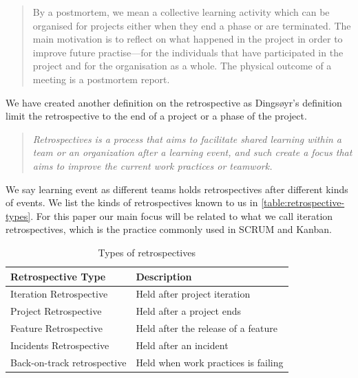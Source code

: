 \begin{quote}
By a postmortem, we mean a collective learning activity which
can be organised for projects either when they end a phase or
are terminated. The main motivation is to reflect on what happened
in the project in order to improve future practise—for the
individuals that have participated in the project and for the organisation
as a whole. The physical outcome of a meeting is a
postmortem report.
\end{quote}

We have created another definition on the retrospective as Dingsøyr's definition limit the retrospective to the end of a project or a phase of the project. 

\begin{quote}
	\textit{Retrospectives is a process that aims to facilitate shared learning within a team or an organization after a learning event, and such create a focus that aims to improve the current work practices or teamwork.}
\end{quote}

We say learning event as different teams holds retrospectives after different kinds of events. We list the kinds of retrospectives known to us in \autoref{table:retrospective-types}. For this paper our main focus will be related to what we call iteration retrospectives, which is the practice commonly used in SCRUM and Kanban. 

\begin{table}[!h]
	\begin{center}
		\caption{Types of retrospectives}
		\label{table:retrospective-types}
		\begin{tabular}{l l}
			\hline
			Retrospective Type & Description \\
			\hline
			Iteration Retrospective & Held after project iteration \\
			Project Retrospective & Held after a project ends \\
			Feature Retrospective & Held after the release of a feature \\
			Incidents Retrospective & Held after an incident \\
			Back-on-track retrospective & Held when work practices is failing \\
			\hline
		\end{tabular}
	\end{center}
\end{table}

